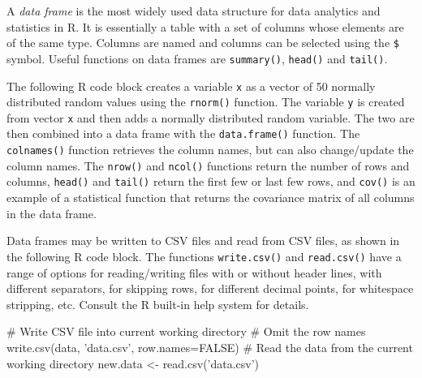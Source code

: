 A \emph{data frame} is the most widely used data structure for data analytics and statistics in R. It is essentially a table with a set of columns whose elements are of the same type. Columns are named and columns can be selected using the \texttt{\$} symbol. Useful functions on data frames are \texttt{summary()}, \texttt{head()} and \texttt{tail()}. 

The following R code block creates a variable \texttt{x} as a vector of 50 normally distributed random values using the \texttt{rnorm()} function. The variable \texttt{y} is created from vector \texttt{x} and then adds a normally distributed random variable. The two are then combined into a data frame with the \texttt{data.frame()} function. The \texttt{colnames()} function retrieves the column names, but can also change/update the column names. The \texttt{nrow()} and \texttt{ncol()} functions return the number of rows and columns, \texttt{head()} and \texttt{tail()} return the first few or last few rows, and \texttt{cov()} is an example of a statistical function that returns the covariance matrix of all columns in the data frame.

\begin{samepage}
\end{samepage}

Data frames may be written to CSV files and read from CSV files, as shown in the following R code block. The functions \texttt{write.csv()} and \texttt{read.csv()} have a range of options for reading/writing files with or without header lines, with different separators, for skipping rows, for different decimal points, for whitespace stripping, etc. Consult the R built-in help system for details.

\begin{samepage}
\begin{Rcode}
# Write CSV file into current working directory
# Omit the row names
write.csv(data, 'data.csv', row.names=FALSE)
# Read the data from the current working directory
new.data <- read.csv('data.csv')
\end{Rcode}
\end{samepage}

